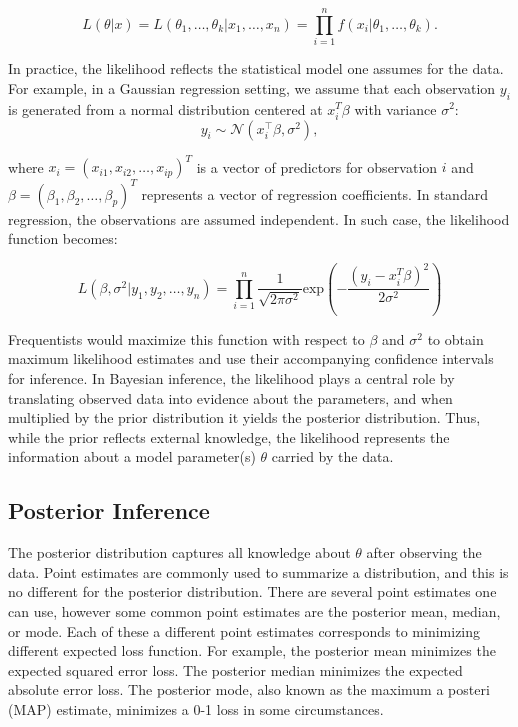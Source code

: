\begin{equation}
    L(\theta|x) = L(\theta_1,\dots,\theta_k|x_1,\dots,x_n)  =  \prod_{i=1}^{n}f(x_i|\theta_1,\dots,\theta_k).
\end{equation}

In practice, the likelihood reflects the statistical model one assumes for the data.  
For example, in a Gaussian regression setting, we assume that each observation \(y_i\) is generated from a normal distribution centered at \(x_i^T\beta\) with variance \(\sigma^2\):
\[
y_i \sim \mathcal{N}(x_i^\top \beta, \sigma^2),
\]

\noindent
where \(x_i = (x_{i1},x_{i2},\dots,x_{ip})^T\) is a vector of predictors for observation \(i\) and \(\beta = (\beta_1,\beta_2,\dots,\beta_p)^T\) represents a vector of regression coefficients.  In standard regression, the observations are assumed independent.  In such case, the likelihood function becomes:

\begin{equation}
    L\left(\beta,\sigma^2|y_1,y_2,\dots,y_n\right) = \prod_{i=1}^{n}\frac{1}{\sqrt{2\pi\sigma^2}}\text{exp}\left(-\frac{(y_i-x_i^T\beta)^2}{2\sigma^2}\right)
\end{equation}

Frequentists would maximize this function with respect to \(\beta\) and \(\sigma^2\) to obtain maximum likelihood estimates and use their accompanying confidence intervals for inference.  
In Bayesian inference, the likelihood plays a central role by translating observed data into evidence about the parameters, and when multiplied by the prior distribution it yields the posterior distribution. Thus, while the prior reflects external knowledge, the likelihood represents the information about a model parameter(s) \(\theta\) carried by the data.

\subsection{Posterior Inference}
The posterior distribution captures all knowledge about $\theta$ after observing the data. Point estimates are commonly used to summarize a distribution, and this is no different for the posterior distribution.  
There are several point estimates one can use, however some common point estimates are the posterior mean, median, or mode.  Each of these a different point estimates corresponds to minimizing different expected loss function.  For example, the posterior mean minimizes the expected squared error loss.  The posterior median minimizes the expected absolute error loss.  The posterior mode, also known as the maximum a posteri (MAP) estimate, minimizes a 0-1 loss in some circumstances.  

